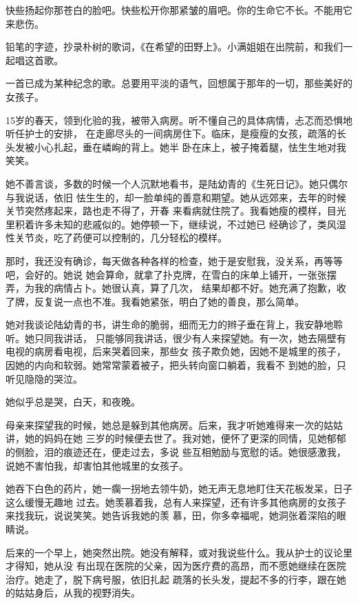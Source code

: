 	\endwriting



		快些扬起你那苍白的脸吧。快些松开你那紧皱的眉吧。你的生命它不长。不能用它来悲伤。

		铅笔的字迹，抄录朴树的歌词，《在希望的田野上》。小满姐姐在出院前，和我们一起唱这首歌。

		一首已成为某种纪念的歌。总要用平淡的语气，回想属于那年的一切，那些美好的女孩子。


		15岁的春天，领到化验的我，被带入病房。听不懂自己的具体病情，忐忑而恐惧地听任护士的安排，
	在走廊尽头的一间病房住下。临床，是瘦瘦的女孩，疏落的长头发被小心扎起，垂在嶙峋的背上。她半
	卧在床上，被子掩着腿，怯生生地对我笑笑。


		她不善言谈，多数的时候一个人沉默地看书，是陆幼青的《生死日记》。她只偶尔与我说话，依旧
	怯生生的，却一脸单纯的善意和期望。她从远郊来，去年的时候关节突然疼起来，路也走不得了，开春
	来看病就住院了。我看她瘦的模样，目光里积着许多未知的悲戚似的。她停顿一下，继续说，不过她已
	经确诊了，类风湿性关节炎，吃了药便可以控制的，几分轻松的模样。


		那时，我还没有确诊，每天做各种各样的检查，她于是安慰我，没关系，再等等吧，会好的。她说
	她会算命，就拿了扑克牌，在雪白的床单上铺开，一张张摆弄，为我的病情占卜。她很认真，算了几次，
	结果却都不好。她充满了抱歉，收了牌，反复说一点也不准。我看她紧张，明白了她的善良，那么简单。


		她对我谈论陆幼青的书，讲生命的脆弱，细而无力的辫子垂在背上，我安静地聆听。她只同我讲话，
	只能够同我讲话，很少有人来探望她。有一次，她去隔壁有电视的病房看电视，后来哭着回来，那些女
	孩子欺负她，因她不是城里的孩子，因她的内向和软弱。她常常蒙着被子，把头转向窗口躺着，我看不
	到她的脸，只听见隐隐的哭泣。


		她似乎总是哭，白天，和夜晚。


		母亲来探望我的时候，她总是躲到其他病房。后来，我才听她难得来一次的姑姑讲，她的妈妈在她
	三岁的时候便去世了。我对她，便怀了更深的同情，见她郁郁的侧脸，泪的痕迹还在，便走过去，多说
	些互相勉励与宽慰的话。她很感激我，说她不害怕我，却害怕其他城里的女孩子。


		她吞下白色的药片，她一瘸一拐地去领牛奶，她无声无息地盯住天花板发呆，日子这么缓慢无趣地
	过去。她羡慕着我，总有人来探望，还有许多其他病房的女孩子来找我玩，说说笑笑。她告诉我她的羡
	慕，田，你多幸福呢，她洞张着深陷的眼睛说。


		后来的一个早上，她突然出院。她没有解释，或对我说些什么。我从护士的议论里才得知，她从没
	有出现在医院的父亲，因为医疗费的高昂，而不愿她继续在医院治疗。她走了，脱下病号服，依旧扎起
	疏落的长头发，提起不多的行李，跟在她的姑姑身后，从我的视野消失。



